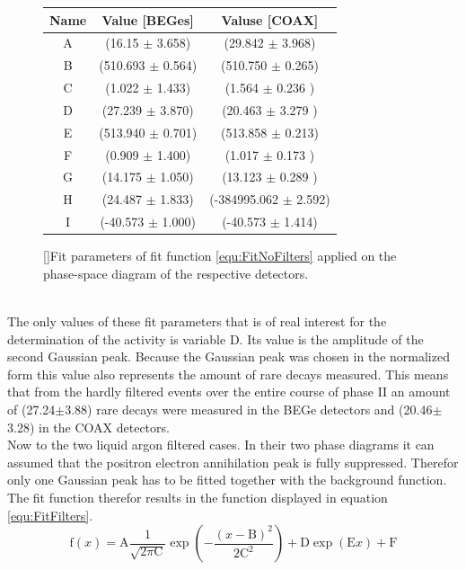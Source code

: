 \begin{figure}[t!]
\centering
\begin{tabular}{|c|c|c}
\hline
Name	& Value [BEGes] & Valuse [COAX]\\ 
\hline
A  &	(16.15 \(\pm\)	3.658)&	(29.842 \(\pm\)	3.968)	\\	
\hline
B  &	(510.693 \(\pm\)	0.564)&	(510.750 \(\pm\)	0.265)\\	
\hline
C  &	(1.022 \(\pm\)	1.433)	&	(1.564 \(\pm\)	0.236	)	\\
\hline
D  &	(27.239 \(\pm\)	3.870)	&	(20.463 \(\pm\)	3.279	)	\\
\hline
E  &	(513.940 \(\pm\)	0.701)	&	(513.858 \(\pm\)	0.213)	\\
\hline
F  &	(0.909 \(\pm\)	1.400)	&	(1.017 \(\pm\)	0.173	)	\\
\hline
G  &	(14.175 \(\pm\)	1.050)	&	(13.123 \(\pm\)	0.289	)	\\
\hline
H  &	(24.487 \(\pm\)	1.833)	&	(-384995.062 \(\pm\)	2.592)	\\
\hline
I  &	(-40.573 \(\pm\) 1.000)	&	(-40.573 \(\pm\)	1.414)\\
\hline

\end{tabular}
\label{tab:FitParNoFilter}
[]{Fit parameters of fit function \ref{equ:FitNoFilters} applied on the phase-space diagram of the respective detectors.}
\end{figure}
\\

The only values of these fit parameters that is of real interest for the determination of the activity is variable D.
Its value is the amplitude of the second Gaussian peak.
Because the Gaussian peak was chosen in the normalized form this value also represents the amount of rare  decays measured.
This means that from the hardly filtered events over the entire course of phase II an amount of (27.24\(\pm\)3.88) rare  decays were measured in the BEGe detectors and (20.46\(\pm\)3.28) in the COAX detectors. 
\\

Now to the two liquid argon filtered cases.
In their two phase diagrams it can assumed that the positron electron annihilation peak is fully suppressed.
Therefor only one Gaussian peak has to be fitted together with the background function.
The fit function therefor results in the function displayed in equation \ref{equ:FitFilters}.
\\ 

\begin{equation}
\mathrm{f}(x) = \mathrm{A}\frac{1}{\sqrt{2\pi\mathrm{C}}}\exp\left(-\frac{(x-\mathrm{B})^2}{2\mathrm{C}^2}\right) + \mathrm{D}\exp\left(\mathrm{E}x\right) + \mathrm{F}
\label{equ:FitFilters}
\end{equation}

